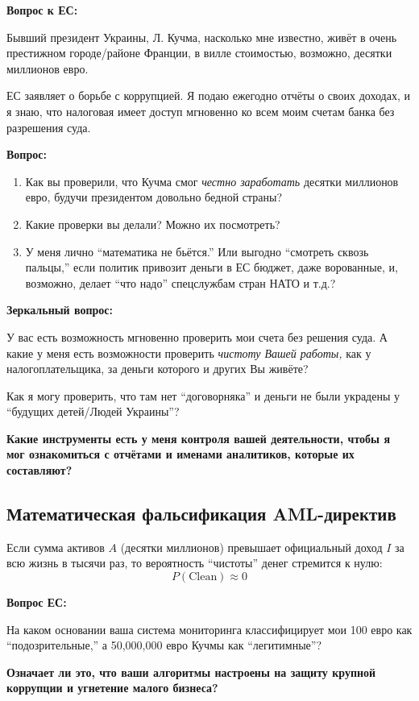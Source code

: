 \documentclass[11pt,a4paper]{article}
\theoremstyle{definition}
\theoremstyle{remark}
\begin{document}
{\textbf{Вопрос к ЕС:}

Бывший президент Украины, Л. Кучма, насколько мне известно, живёт в очень престижном 
городе/районе Франции, в вилле стоимостью, возможно, десятки миллионов евро.

ЕС заявляет о борьбе с коррупцией. Я подаю ежегодно отчёты о своих доходах, и я знаю, 
что налоговая имеет доступ мгновенно ко всем моим счетам банка без разрешения суда.

\textbf{Вопрос:}
\begin{enumerate}
\item Как вы проверили, что Кучма смог \textit{честно заработать} десятки миллионов 
евро, будучи президентом довольно бедной страны?
\item Какие проверки вы делали? Можно их посмотреть?
\item У меня лично ``математика не бьётся.'' Или выгодно ``смотреть сквозь пальцы,'' 
если политик привозит деньги в ЕС бюджет, даже ворованные, и, возможно, делает ``что 
надо'' спецслужбам стран НАТО и т.д.?
\end{enumerate}

\textbf{Зеркальный вопрос:}

У вас есть возможность мгновенно проверить мои счета без решения суда. А какие у меня 
есть возможности проверить \textit{чистоту Вашей работы,} как у налогоплательщика, 
за деньги которого и других Вы живёте?

Как я могу проверить, что там нет ``договорняка'' и деньги не были украдены у 
``будущих детей/Людей Украины''?

\textbf{Какие инструменты есть у меня контроля вашей деятельности, чтобы я мог 
ознакомиться с отчётами и именами аналитиков, которые их составляют?}

\subsection{Математическая фальсификация AML-директив}

Если сумма активов $A$ (десятки миллионов) превышает официальный доход $I$ за всю 
жизнь в тысячи раз, то вероятность ``чистоты'' денег стремится к нулю:
\[
P(\text{Clean}) \approx 0
\]

\textbf{Вопрос ЕС:}

На каком основании ваша система мониторинга классифицирует мои 100 евро как 
``подозрительные,'' а 50,000,000 евро Кучмы как ``легитимные''?

\textbf{Означает ли это, что ваши алгоритмы настроены на защиту крупной коррупции 
и угнетение малого бизнеса?}

}
\end{document}
